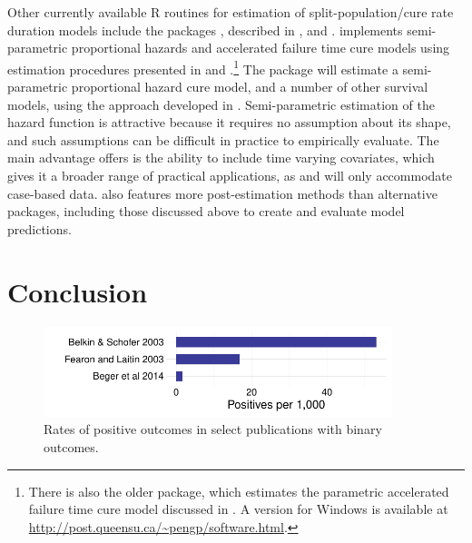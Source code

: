Other currently available {\sf R} routines for estimation of split-population/cure rate duration models include the packages   \citep{cai2012smcureR}, described in \citet{cai2012smcure}, and  \citep{garibotti2010nltm}.  implements semi-parametric proportional hazards and accelerated failure time cure models using estimation procedures presented in \citet{peng2003fitting} and \citet{zhang2007new}.\footnote{There is also the older  package, which estimates the parametric accelerated failure time cure model discussed in \citet{peng1998generalized}. A version for Windows is available at \url{http://post.queensu.ca/~pengp/software.html}.} The package  will estimate a semi-parametric proportional hazard cure model, and a number of other survival models, using the approach developed in \citet{tsodikov2003semiparametric,tsodikov2007profile}. Semi-parametric estimation of the hazard function is attractive because it requires no assumption about its shape, and such assumptions can be difficult in practice to empirically evaluate. The main advantage  offers is the ability to include time varying covariates, which gives it a broader range of practical applications, as  and  will only accommodate case-based data.  also features more post-estimation methods than alternative packages, including those discussed above to create and evaluate model predictions.  


\section{Conclusion}

\begin{figure}[htbp!]
\centering
\includegraphics[width = 4in]{graphics/rates.pdf}
\caption{Rates of positive outcomes in select publications with binary outcomes.}
\label{rates}
\end{figure}

